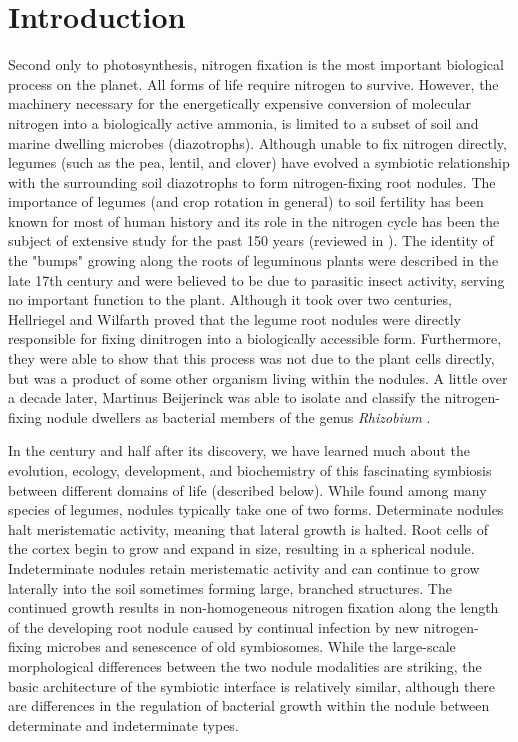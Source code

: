 \section*{Introduction} 
Second only to photosynthesis, nitrogen fixation is the most important
biological process on the planet. All forms of life require nitrogen to survive.
However, the machinery necessary for the energetically expensive conversion of
molecular nitrogen into a biologically active ammonia, is limited to a subset of
soil and marine dwelling microbes (diazotrophs). Although unable to fix nitrogen
directly, legumes (such as the pea, lentil, and clover) have evolved a symbiotic
relationship with the surrounding soil diazotrophs to form
nitrogen-fixing root nodules. The importance of legumes (and crop rotation in
general) to soil fertility has been known for most of human history and its role
in the nitrogen cycle has been the subject of extensive study for the past 150
years (reviewed in \citet{Hirsch:2009to}). The identity  of the
"bumps" growing along the roots of leguminous plants were described in the late
17th century and were believed to be due to parasitic insect activity, serving
no important function to the plant. Although it took over two centuries, 
Hellriegel and Wilfarth \cite{Hellriegel:1888ug} proved that the legume root nodules were
directly responsible for fixing dinitrogen into a biologically accessible form.
Furthermore, they were able to show that this process was not due to the plant
cells directly, but was a product of some other organism living within the
nodules. A little over a decade later, Martinus Beijerinck was able to
isolate and classify the nitrogen-fixing nodule dwellers as bacterial members of
the genus \textit{Rhizobium} \cite{Beijerinck:1901wz}.  

In the century and half after its discovery, we have learned much about the
evolution, ecology, development, and biochemistry of this fascinating
symbiosis between different domains of life (described below). While found among
many species of legumes, nodules typically take one of two forms. Determinate
nodules halt meristematic activity, meaning that lateral growth is halted. Root
cells of the cortex begin to grow and expand in size, resulting in a spherical
nodule.  Indeterminate nodules retain meristematic activity and can continue to
grow laterally into the soil sometimes forming large, branched structures. The
continued growth results in non-homogeneous nitrogen fixation along the length
of the developing root nodule \cite{Crespi:2000dw} caused by continual infection
by new nitrogen-fixing microbes and senescence of old symbiosomes. While the
large-scale morphological differences between the two nodule modalities are
striking, the basic architecture of the symbiotic interface is relatively
similar, although there are differences in the regulation of bacterial growth
within the nodule between determinate and indeterminate types. 

